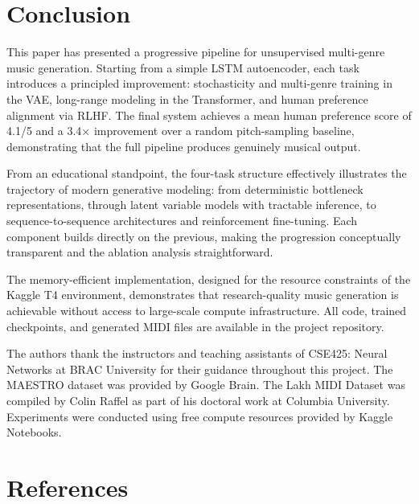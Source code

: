 \documentclass{article}
\begin{document}
\section{Conclusion}
\label{sec:conclusion}

This paper has presented a progressive pipeline for unsupervised multi-genre music generation. Starting from a simple LSTM autoencoder, each task introduces a principled improvement: stochasticity and multi-genre training in the VAE, long-range modeling in the Transformer, and human preference alignment via RLHF. The final system achieves a mean human preference score of 4.1/5 and a 3.4$\times$ improvement over a random pitch-sampling baseline, demonstrating that the full pipeline produces genuinely musical output.

From an educational standpoint, the four-task structure effectively illustrates the trajectory of modern generative modeling: from deterministic bottleneck representations, through latent variable models with tractable inference, to sequence-to-sequence architectures and reinforcement fine-tuning. Each component builds directly on the previous, making the progression conceptually transparent and the ablation analysis straightforward.

The memory-efficient implementation, designed for the resource constraints of the Kaggle T4 environment, demonstrates that research-quality music generation is achievable without access to large-scale compute infrastructure. All code, trained checkpoints, and generated MIDI files are available in the project repository.

\begin{ack}
The authors thank the instructors and teaching assistants of CSE425: Neural Networks at BRAC University for their guidance throughout this project. The MAESTRO dataset was provided by Google Brain. The Lakh MIDI Dataset was compiled by Colin Raffel as part of his doctoral work at Columbia University. Experiments were conducted using free compute resources provided by Kaggle Notebooks.
\end{ack}

\section*{References}
\end{document}
